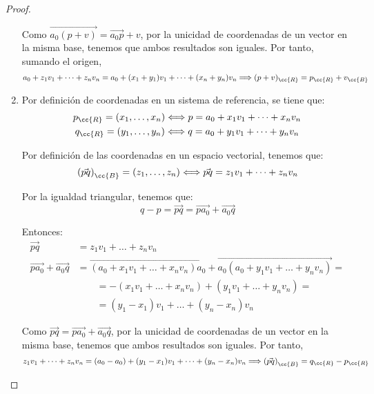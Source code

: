\begin{proof}
\begin{enumerate}
        Como $\vec{a_0(p+v)}=\vec{a_0p}+v$, por la unicidad de coordenadas de un vector en la misma base, tenemos que ambos resultados son iguales. Por tanto, sumando el origen,
        \begin{equation*}
            a_0+z_1v_1+\dots+z_nv_n = a_0+(x_1+y_1)v_1 + \dots + (x_n+y_n)v_n \Longrightarrow (p+v)_\cc{R}=p_{\cc{R}} + v_{\cc{B}}
        \end{equation*}

        \item Por definición de coordenadas en un sistema de referencia, se tiene que:
        \begin{gather*}
            p_{\cc{R}}=(x_1,\dots,x_n)\Longleftrightarrow p=a_0+x_1v_1+\dots + x_nv_n\\
            q_{\cc{R}}=(y_1,\dots,y_n)\Longleftrightarrow q=a_0+y_1v_1+\dots + y_nv_n\\
        \end{gather*}

        Por definición de las coordenadas en un espacio vectorial, tenemos que:
        \begin{equation*}
            \left(\vec{pq}\right)_{\cc{B}}=(z_1,\dots,z_n)\Longleftrightarrow \vec{pq}=z_1v_1+\dots+z_nv_n
        \end{equation*}

        Por la igualdad triangular, tenemos que:
        \begin{equation*}
            q-p=\vec{pq} = \vec{pa_0} + \vec{a_0q}
        \end{equation*}
        
        Entonces:
        \begin{equation*}\begin{split}
            \vec{pq}&=z_1v_1+\dots+z_nv_n \\
            \vec{pa_0} + \vec{a_0q} &= \vec{(a_0+x_1v_1+\dots + x_nv_n)a_0} + \vec{a_0(a_0+y_1v_1+\dots + y_nv_n)} =\\&\qquad=
            -(x_1v_1+\dots + x_nv_n) + (y_1v_1+\dots + y_nv_n)
            =\\&\qquad= (y_1-x_1)v_1 + \dots + (y_n-x_n)v_n
        \end{split}\end{equation*}

        Como $\vec{pq} = \vec{pa_0} + \vec{a_0q}$, por la unicidad de coordenadas de un vector en la misma base, tenemos que ambos resultados son iguales. Por tanto,
        \begin{equation*}
            z_1v_1+\dots+z_nv_n = (a_0-a_0) + (y_1-x_1)v_1 + \dots + (y_n-x_n)v_n \Longrightarrow \left(\vec{pq}\right)_{\cc{B}}=q_{\cc{R}}-p_{\cc{R}}
        \end{equation*}
    \end{enumerate}
\end{proof}


